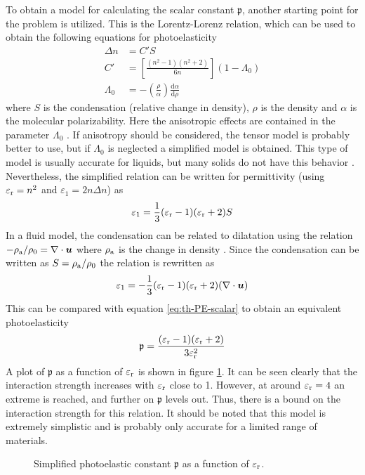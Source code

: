 \documentclass[11pt,twoside]{eitExjobb}
\begin{document}
	To obtain a model for calculating the scalar constant $\mathfrak{p}$, another starting point for the problem is utilized. This is the Lorentz-Lorenz relation, which can be used to obtain the following equations for photoelasticity \cite{Korpel1988}
	\begin{align*}
		\Delta n &= C' S \\
		C' &= \left[ \frac{(n^2-1)(n^2+2)}{6n} \right](1-\Lambda_0) \\
		\Lambda_0 &= -\left( \frac{\rho}{\alpha} \right) \frac{\mathrm{d} \alpha}{\mathrm{d} \rho}
	\end{align*}
	where $S$ is the condensation (relative change in density), $\rho$ is the density and $\alpha$ is the molecular polarizability. Here the anisotropic effects are contained in the parameter $\Lambda_0$ \cite{Korpel1988}. If anisotropy should be considered, the tensor model is probably better to use, but if $\Lambda_0$ is neglected a simplified model is obtained. This type of model is usually accurate for liquids, but many solids do not have this behavior \cite{Korpel1988}. Nevertheless, the simplified relation can be written for permittivity (using $\varepsilon_{\mathrm{r}} = n^2$ and $\varepsilon_1 = 2n \Delta n$) as
	\begin{equation*}
		\varepsilon_1 = \frac{1}{3} (\varepsilon_{\mathrm{r}} - 1)(\varepsilon_{\mathrm{r}} + 2) S
	\end{equation*}
	In a fluid model, the condensation can be related to dilatation using the relation $-\rho_{\mathrm{a}}/\rho_0 = \nabla \cdot \bm{u}$ where $\rho_{\mathrm{a}}$ is the change in density \cite{Kaufman2000}. Since the condensation can be written as $S = \rho_{\mathrm{a}}/\rho_0$ \cite{Korpel1988} the relation is rewritten as
	\begin{equation*}
		\varepsilon_1 = -\frac{1}{3} (\varepsilon_{\mathrm{r}} - 1)(\varepsilon_{\mathrm{r}} + 2) (\nabla \cdot \bm{u})
	\end{equation*}
	This can be compared with equation \eqref{eq:th-PE-scalar} to obtain an equivalent photoelasticity
	\begin{equation}
		\mathfrak{p} = \frac{(\varepsilon_{\mathrm{r}} - 1)(\varepsilon_{\mathrm{r}} + 2)}{3\varepsilon_{\mathrm{r}}^2}
		\label{eq:th-PE-liquid-model}
	\end{equation}
	A plot of $\mathfrak{p}$ as a function of $\varepsilon_{\mathrm{r}}$ is shown in figure \ref{fig:photoelastic-liquid}. It can be seen clearly that the interaction strength increases with $\varepsilon_{\mathrm{r}}$ close to 1. However, at around $\varepsilon_{\mathrm{r}} = 4$ an extreme is reached, and further on $\mathfrak{p}$ levels out. Thus, there is a bound on the interaction strength for this relation. It should be noted that this model is extremely simplistic and is probably only accurate for a limited range of materials.
	\begin{figure}[h]
		\centering
		\resizebox{\textwidth}{!}{
			
		}
		\caption{\label{fig:photoelastic-liquid} Simplified photoelastic constant $\mathfrak{p}$ as a function of $\varepsilon_{\mathrm{r}}$.}
	\end{figure}
	
\end{document}
